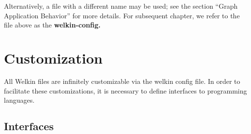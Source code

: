 Alternatively, a file with a different name may be used; see the section ``Graph Application Behavior'' for more details. For subsequent chapter, we refer to the file above as the \textbf{welkin-config.}

\section{Customization}
All Welkin files are infinitely customizable via the welkin config file. In order to facilitate these customizations, it is necessary to define interfaces to programming languages.

\subsection{Interfaces}


